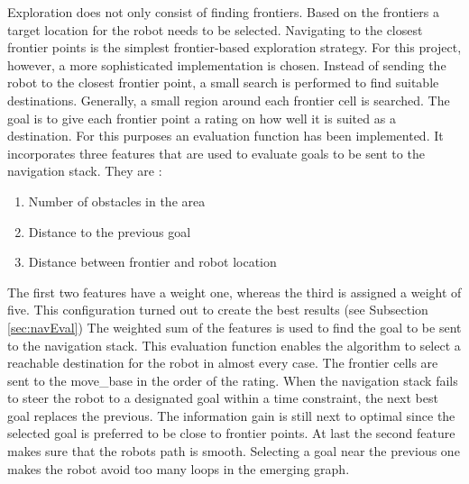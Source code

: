 \documentclass{ba-kecs}
\begin{document}
Exploration does not only consist of finding frontiers. Based on the frontiers a target location for the robot needs to be selected. Navigating to the closest frontier points is the simplest frontier-based exploration strategy. For this project, however, a more sophisticated implementation is chosen. Instead of sending the robot to the closest frontier point, a small search is performed to find suitable destinations. Generally, a small region around each frontier cell is searched. The goal is to give each frontier point a rating on how well it is suited as a destination. For this purposes an evaluation function has been implemented. It incorporates three features that are used to evaluate goals to be sent to the navigation stack. They are :
\begin{enumerate}
\item{Number of obstacles in the area}
\item{Distance to the previous goal}
\item{Distance between frontier and robot location}
\end{enumerate}
The first two features have a weight one, whereas the third is assigned a weight of five. This configuration turned out to create the best results (see Subsection \ref{sec:navEval}) The weighted sum of the features is used to find the goal to be sent to the navigation stack. This evaluation function enables the algorithm to select a reachable destination for the robot in almost every case. The frontier cells are sent to the move\_base in the order of the rating. When the navigation stack fails to steer the robot to a designated goal within a time constraint, the next best goal replaces the previous. The information gain is still next to optimal since the selected goal is preferred to be close to frontier points. At last the second feature makes sure that the robots path is smooth. Selecting a goal near the previous one makes the robot avoid too many loops in the emerging graph.
\end{document}
